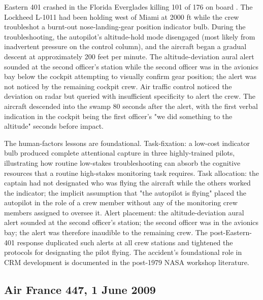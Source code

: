 Eastern 401 crashed in the Florida Everglades killing 101 of 176 on board \cite{acc:ntsb-aar73-14}. The Lockheed L-1011 had been holding west of Miami at 2000 ft while the crew troubleshot a burnt-out nose-landing-gear position indicator bulb. During the troubleshooting, the autopilot's altitude-hold mode disengaged (most likely from inadvertent pressure on the control column), and the aircraft began a gradual descent at approximately 200 feet per minute. The altitude-deviation aural alert sounded at the second officer's station while the second officer was in the avionics bay below the cockpit attempting to visually confirm gear position; the alert was not noticed by the remaining cockpit crew. Air traffic control noticed the deviation on radar but queried with insufficient specificity to alert the crew. The aircraft descended into the swamp 80 seconds after the alert, with the first verbal indication in the cockpit being the first officer's "we did something to the altitude" seconds before impact.

The human-factors lessons are foundational. Task-fixation: a low-cost indicator bulb produced complete attentional capture in three highly-trained pilots, illustrating how routine low-stakes troubleshooting can absorb the cognitive resources that a routine high-stakes monitoring task requires. Task allocation: the captain had not designated who was flying the aircraft while the others worked the indicator; the implicit assumption that "the autopilot is flying" placed the autopilot in the role of a crew member without any of the monitoring crew members assigned to oversee it. Alert placement: the altitude-deviation aural alert sounded at the second officer's station; the second officer was in the avionics bay; the alert was therefore inaudible to the remaining crew. The post-Eastern-401 response duplicated such alerts at all crew stations and tightened the protocols for designating the pilot flying. The accident's foundational role in CRM development is documented in the post-1979 NASA workshop literature.

\subsection*{Air France 447, 1 June 2009}


